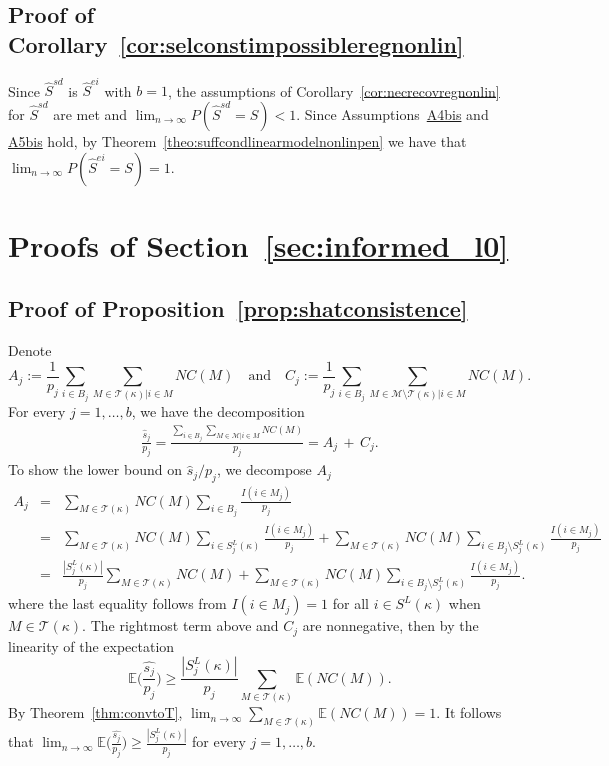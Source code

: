 \documentclass[
  12pt]{article}
\newcommand{\E}{\mathbb{E}}
\newcommand{\M}{\mathcal{M}}
\newcommand{\T}{\mathcal{T}}
\begin{document}
\subsection{Proof of Corollary~\ref{cor:selconstimpossibleregnonlin}}
Since $\hat{S}^{sd}$ is $\hat{S}^{ei}$ with $b=1$, the assumptions of Corollary~\ref{cor:necrecovregnonlin} for $\hat{S}^{sd}$ are met and $\lim_{n \to \infty} P(\hat{S}^{sd} = S) < 1$. Since Assumptions~\hyperlink{lab:A4bis}{A4bis} and \hyperlink{lab:A5bis}{A5bis} hold, by Theorem~\ref{theo:suffcondlinearmodelnonlinpen} we have that $\lim_{n \to \infty} P(\hat{S}^{ei} = S)= 1$.

 
\section{Proofs of Section~\ref{sec:informed_l0}}\label{suppsec:proofsempbayes}

\subsection{Proof of Proposition~\ref{prop:shatconsistence}}
Denote
$$A_j:=\frac{1}{p_j}\sum_{i \in B_j}\sum_{M \in \T(\kappa)|i\in M}NC(M) \quad\text{and}\quad  C_j:=\frac{1}{p_j}\sum_{i \in B_j}\sum_{M \in \M\setminus \T(\kappa)|i\in M}NC(M).$$
For every $j=1,\ldots,b$, we have the decomposition
\begin{gather}\label{eq:decompshat}
    \frac{\hat{s}_j}{p_j}
    =\frac{\sum_{i \in B_j} \sum_{M \in \M | i \in M} NC(M)}{p_j}
   =A_j\,+\, C_j.
\end{gather}
To show the lower bound on $\hat{s}_j/p_j$, we decompose $A_j$
\begin{eqnarray}
  A_j
   &=& \sum_{M \in \T(\kappa)}NC(M)\sum_{i \in B_j}\frac{I(i\in M_j)}{p_j}\nonumber\\
   &=& \sum_{M \in \T(\kappa)}NC(M)\sum_{i \in S^{L}_j(\kappa)}\frac{I(i\in M_j)}{p_j}+\sum_{M \in \T(\kappa)}NC(M)\sum_{i \in B_j\setminus S^{L}_j(\kappa)}\frac{I(i\in M_j)}{p_j}\nonumber\\
   &=& \frac{|S^{L}_j(\kappa)|}{p_j}\sum_{M \in \T(\kappa)}NC(M)+\sum_{M \in \T(\kappa)}NC(M)\sum_{i \in B_j\setminus S^{L}_j(\kappa)}\frac{I(i\in M_j)}{p_j}\label{eq:wigr}.
\end{eqnarray}
where the last equality follows from $I(i\in M_j)=1$ for all $i\in S^L(\kappa)$ when $M\in\T(\kappa)$. The rightmost term above and $C_j$ are nonnegative, then by the linearity of the expectation
$$\E\Big(\frac{\widehat{s_j}}{p_j}\Big)\geq\frac{|S^{L}_j(\kappa)|}{p_j}\sum_{M \in \T(\kappa)}\E(NC(M)).$$
By Theorem~\ref{thm:convtoT}, $\lim_{n\to\infty}\sum_{M \in \T(\kappa)}\E(NC(M))=1$. It follows that $\lim_{n\to\infty}\E\Big(\frac{\widehat{s_j}}{p_j}\Big)\geq \frac{|S^{L}_j(\kappa)|}{p_j}$ for every $j=1,\ldots,b$.
\end{document}
